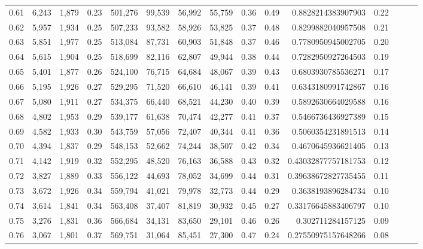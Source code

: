 \begin{tabular}{rrrrrrrrrrrrrrr}
0.61 &   6,243 &  1,879 &  0.23 &  501,276 &   99,539 &   56,992 &   55,759 &  0.36 &  0.49 &     0.8828214383907903 &      0.22 \\
0.62 &   5,957 &  1,934 &  0.25 &  507,233 &   93,582 &   58,926 &   53,825 &  0.37 &  0.48 &     0.8299882040957508 &      0.21 \\
0.63 &   5,851 &  1,977 &  0.25 &  513,084 &   87,731 &   60,903 &   51,848 &  0.37 &  0.46 &     0.7780950945002705 &      0.20 \\
0.64 &   5,615 &  1,904 &  0.25 &  518,699 &   82,116 &   62,807 &   49,944 &  0.38 &  0.44 &     0.7282950927264503 &      0.19 \\
0.65 &   5,401 &  1,877 &  0.26 &  524,100 &   76,715 &   64,684 &   48,067 &  0.39 &  0.43 &     0.6803930785536271 &      0.17 \\
0.66 &   5,195 &  1,926 &  0.27 &  529,295 &   71,520 &   66,610 &   46,141 &  0.39 &  0.41 &     0.6343180991742867 &      0.16 \\
0.67 &   5,080 &  1,911 &  0.27 &  534,375 &   66,440 &   68,521 &   44,230 &  0.40 &  0.39 &     0.5892630664029588 &      0.16 \\
0.68 &   4,802 &  1,953 &  0.29 &  539,177 &   61,638 &   70,474 &   42,277 &  0.41 &  0.37 &     0.5466736436927389 &      0.15 \\
0.69 &   4,582 &  1,933 &  0.30 &  543,759 &   57,056 &   72,407 &   40,344 &  0.41 &  0.36 &     0.5060354231891513 &      0.14 \\
0.70 &   4,394 &  1,837 &  0.29 &  548,153 &   52,662 &   74,244 &   38,507 &  0.42 &  0.34 &     0.4670645936621405 &      0.13 \\
0.71 &   4,142 &  1,919 &  0.32 &  552,295 &   48,520 &   76,163 &   36,588 &  0.43 &  0.32 &    0.43032877757181753 &      0.12 \\
0.72 &   3,827 &  1,889 &  0.33 &  556,122 &   44,693 &   78,052 &   34,699 &  0.44 &  0.31 &    0.39638672827735455 &      0.11 \\
0.73 &   3,672 &  1,926 &  0.34 &  559,794 &   41,021 &   79,978 &   32,773 &  0.44 &  0.29 &     0.3638193896284734 &      0.10 \\
0.74 &   3,614 &  1,841 &  0.34 &  563,408 &   37,407 &   81,819 &   30,932 &  0.45 &  0.27 &    0.33176645883406797 &      0.10 \\
0.75 &   3,276 &  1,831 &  0.36 &  566,684 &   34,131 &   83,650 &   29,101 &  0.46 &  0.26 &      0.302711284157125 &      0.09 \\
0.76 &   3,067 &  1,801 &  0.37 &  569,751 &   31,064 &   85,451 &   27,300 &  0.47 &  0.24 &    0.27550975157648266 &      0.08 \\

\end{tabular}
